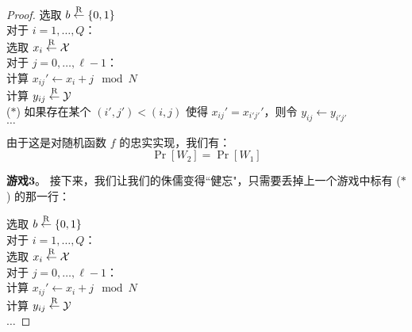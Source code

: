 \begin{proof}
\vspace{5pt}

\hspace*{5pt} 选取 $b\overset{\rm R}\leftarrow\{0,1\}$\\
\hspace*{26pt} 对于 $i=1,\dots,Q$：\\
\hspace*{50pt} 选取 $x_i\overset{\rm R}\leftarrow\mathcal{X}$\\
\hspace*{50pt} 对于 $j=0,\dots,\ell-1$：\\
\hspace*{75pt} 计算 $x_{ij}'\leftarrow x_i+j\mod N$\\
\hspace*{75pt} 计算 $y_{ij}\overset{\rm R}\leftarrow\mathcal{Y}$\\
\hspace*{3pt} ($*$)
\hspace*{51pt} 如果存在某个 $(i',j')<(i,j)$ 使得 $x_{ij}'=x_{i'j'}'$，则令 $y_{ij}\leftarrow y_{i'j'}$\\
\hspace*{26pt} $\dots$

\vspace{5pt}

由于这是对随机函数 $f$ 的忠实实现，我们有：
\begin{equation}\label{eq:5-18}
\Pr[W_2]=\Pr[W_1]
\end{equation}

\noindent\textbf{游戏$\mathbf{3}$}。
接下来，我们让我们的侏儒变得``健忘"，只需要丢掉上一个游戏中标有 ($*$) 的那一行：

\vspace{5pt}

\hspace*{5pt} 选取 $b\overset{\rm R}\leftarrow\{0,1\}$\\
\hspace*{26pt} 对于 $i=1,\dots,Q$：\\
\hspace*{50pt} 选取 $x_i\overset{\rm R}\leftarrow\mathcal{X}$\\
\hspace*{50pt} 对于 $j=0,\dots,\ell-1$：\\
\hspace*{75pt} 计算 $x_{ij}'\leftarrow x_i+j\mod N$\\
\hspace*{75pt} 计算 $y_{ij}\overset{\rm R}\leftarrow\mathcal{Y}$\\
\hspace*{26pt} $\dots$


\end{proof}
